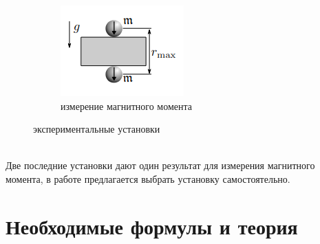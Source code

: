 \documentclass[a4paper, 12pt]{article}
\begin{document}
\begin{figure}[htbp]
\begin{subfigure}{0.2\textwidth}
            \includegraphics[width=\linewidth]{p3.png}
            \caption{измерение магнитного момента}
            \label{магнитный момент установка}
        \end{subfigure}
        \caption{экспериментальные установки}
        \label{установки}
    \end{figure}\\
Две последние установки дают один результат для измерения магнитного момента, в работе предлагается выбрать установку самостоятельно.
\section*{Необходимые формулы и теория}
\end{document}
